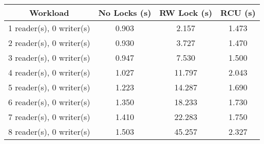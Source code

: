 \begin{tabular}{|c|c|c|c|}
\hline Workload &No Locks (s) & RW Lock (s) & RCU (s) \\
\hline 1 reader(s), 0 writer(s) & 0.903 & 2.157 & 1.473\\
\hline 2 reader(s), 0 writer(s) & 0.930 & 3.727 & 1.470\\
\hline 3 reader(s), 0 writer(s) & 0.947 & 7.530 & 1.500\\
\hline 4 reader(s), 0 writer(s) & 1.027 & 11.797 & 2.043\\
\hline 5 reader(s), 0 writer(s) & 1.223 & 14.287 & 1.690\\
\hline 6 reader(s), 0 writer(s) & 1.350 & 18.233 & 1.730\\
\hline 7 reader(s), 0 writer(s) & 1.410 & 22.283 & 1.750\\
\hline 8 reader(s), 0 writer(s) & 1.503 & 45.257 & 2.327\\
\hline
\end{tabular}
